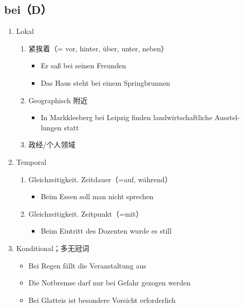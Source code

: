 \documentclass[UTF8]{report}
\begin{document}
\subsection{bei（D）}
\begin{enumerate}
    \item Lokal
    \begin{enumerate}
        \item 紧挨着（= vor, hinter, über, unter, neben）
        \begin{itemize}
            \item Er saß bei seinen Freunden
            \item Das Haus steht bei einem Springbrunnen
        \end{itemize}
        \item Geographisch 附近
        \begin{itemize}
            \item In Markkleeberg bei Leipzig finden landwirtschaftliche Ausstel- lungen statt
        \end{itemize}
        \item 政经/个人领域
    \end{enumerate}
    \item Temporal
    \begin{enumerate}
        \item Gleichzeitigkeit. Zeitdauer（=auf, während）
        \begin{itemize}
            \item Beim Essen soll man nicht sprechen
        \end{itemize}
        \item Gleichzeitigkeit. Zeitpunkt（=mit）
        \begin{itemize}
            \item Beim Eintritt des Dozenten wurde es still
        \end{itemize}
    \end{enumerate}
    \item Konditional；多无冠词
    \begin{itemize}
        \item Bei Regen fällt die Veranstaltung aus
        \item Die Notbremse darf nur bei Gefahr gezogen werden
        \item Bei Glatteis ist besondere Vorsicht erforderlich
    \end{itemize}
\end{enumerate}
\end{document}
